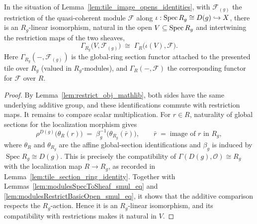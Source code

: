 \begin{lemma}
  \label{lem:tile_section_comparison}
  In the situation of Lemma~\ref{lem:tile_image_opens_identities}, with
  \(\mathcal{F}_{(g)}\) the restriction of the quasi-coherent module
  \(\mathcal{F}\) along \(\iota : \operatorname{Spec} R_g \cong D(g) \hookrightarrow X\), there is an \(R_g\)-linear
  isomorphism, natural in the open \(V \subseteq \operatorname{Spec} R_g\) and intertwining the restriction maps of the
  two sheaves,
  \[
    \Gamma_{R_g}\bigl(V, \mathcal{F}_{(g)}\bigr) \;\cong\; \Gamma_R\bigl(\iota(V), \mathcal{F}\bigr).
  \]
  Here \(\Gamma_{R_g}(-, \mathcal{F}_{(g)})\) is the global-ring section functor attached to the
  presented tile over \(R_g\) (valued in \(R_g\)-modules), and \(\Gamma_R(-, \mathcal{F})\) the
  corresponding functor for \(\mathcal{F}\) over \(R\).
\end{lemma}
\begin{proof}
  By Lemma~\ref{lem:restrict_obj_mathlib}, both sides have the same underlying additive
  group, and these identifications commute with restriction maps. It remains to compare
  scalar multiplication. For \(r\in R\), naturality of global sections for the
  localization morphism gives
  \[
    \rho^{D(g)}\bigl(\theta_R(r)\bigr)
      \;=\;
    \beta_g^{-1}\bigl(\theta_{R_g}(\bar r)\bigr),
    \qquad \bar r \;=\; \text{image of } r \text{ in } R_g,
  \]
  where \(\theta_R\) and \(\theta_{R_g}\) are the affine global-section
  identifications and \(\beta_g\) is induced by
  \(\operatorname{Spec}R_g\cong D(g)\). This is precisely the compatibility of
  \(\Gamma(D(g),\mathcal O)\cong R_g\) with the localization map \(R\to R_g\), as
  recorded in Lemma~\ref{lem:tile_section_ring_identity}. Together with
  Lemmas~\ref{lem:modulesSpecToSheaf_smul_eq} and
  \ref{lem:modulesRestrictBasicOpen_smul_eq}, it shows that the additive comparison
  respects the \(R_g\)-action. Hence it is an \(R_g\)-linear isomorphism, and its
  compatibility with restrictions makes it natural in \(V\).
\end{proof}

